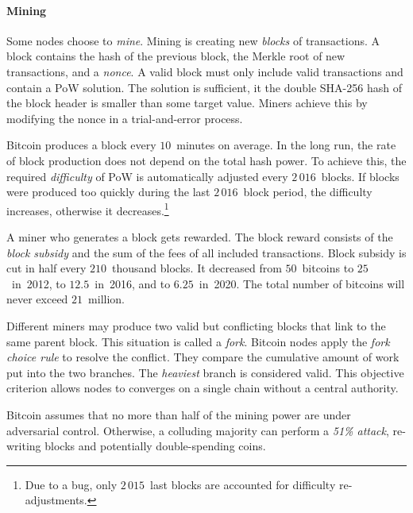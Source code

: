 \paragraph{Mining}

Some nodes choose to \textit{mine}.
Mining is creating new \textit{blocks} of transactions.
A block contains the hash of the previous block, the Merkle root of new transactions, and a \textit{nonce}.
A valid block must only include valid transactions and contain a PoW solution.
The solution is sufficient, it the double SHA-256 hash of the block header is smaller than some target value.
Miners achieve this by modifying the nonce in a trial-and-error process.

Bitcoin produces a block every $10$~minutes on average.
In the long run, the rate of block production does not depend on the total hash power.
To achieve this, the required \textit{difficulty} of PoW is automatically adjusted every $2\,016$~blocks.
If blocks were produced too quickly during the last $2\,016$~block period, the difficulty increases, otherwise it decreases.\footnote{Due to a bug, only $2\,015$~last blocks are accounted for difficulty re-adjustments.}

A miner who generates a block gets rewarded.
The block reward consists of the \textit{block subsidy} and the sum of the fees of all included transactions.
Block subsidy is cut in half every $210$~thousand blocks.
It decreased from $50$~bitcoins to $25$~in~2012, to $12.5$~in~2016, and to $6.25$~in~2020.
The total number of bitcoins will never exceed $21$~million.

Different miners may produce two valid but conflicting blocks that link to the same parent block.
This situation is called a \textit{fork}.
Bitcoin nodes apply the \textit{fork choice rule} to resolve the conflict.
They compare the cumulative amount of work put into the two branches.
The \textit{heaviest} branch is considered valid.
This objective criterion allows nodes to converges on a single chain without a central authority.

Bitcoin assumes that no more than half of the mining power are under adversarial control.
Otherwise, a colluding majority can perform a \textit{51\% attack}, re-writing blocks and potentially double-spending coins.

